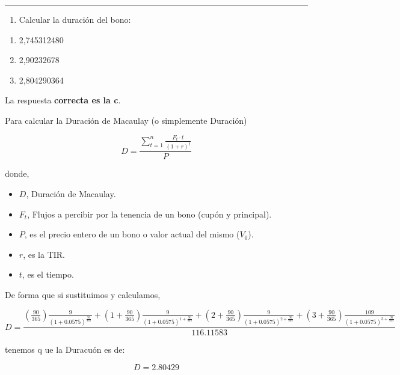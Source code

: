 \documentclass[
  letterpaper,
  DIV=11,
  numbers=noendperiod]{scrartcl}
\providecommand{\tightlist}{%
  \setlength{\itemsep}{0pt}\setlength{\parskip}{0pt}}\usepackage{longtable,booktabs,array}
\begin{document}
\begin{center}\rule{0.5\linewidth}{0.5pt}\end{center}

\begin{enumerate}
\def\labelenumi{\arabic{enumi}.}
\setcounter{enumi}{1}
\tightlist
\item
  Calcular la duración del bono:
\end{enumerate}

\begin{enumerate}
\def\labelenumi{\alph{enumi}.}
\item
  2,745312480
\item
  2,90232678
\item
  2,804290364
\end{enumerate}

\begin{tcolorbox}[enhanced jigsaw, colframe=quarto-callout-tip-color-frame, opacityback=0, opacitybacktitle=0.6, colback=white, leftrule=.75mm, bottomtitle=1mm, colbacktitle=quarto-callout-tip-color!10!white, coltitle=black, toprule=.15mm, left=2mm, breakable, toptitle=1mm, titlerule=0mm, title=\textcolor{quarto-callout-tip-color}{\faLightbulb}\hspace{0.5em}{Solución}, arc=.35mm, rightrule=.15mm, bottomrule=.15mm]

La respuesta \textbf{correcta es la c}.

Para calcular la Duración de Macaulay (o simplemente Duración)

\[D=\frac{\sum_{t=1}^{n}\frac{F_t\cdot t}{\left(1+r\right)^t}}{P}\]

donde,

\begin{itemize}
\item
  \(D\), Duración de Macaulay.
\item
  \(F_t\), Flujos a percibir por la tenencia de un bono (cupón y
  principal).
\item
  \(P\), es el precio entero de un bono o valor actual del mismo
  (\(V_0\)).
\item
  \(r\), es la TIR.
\item
  \(t\), es el tiempo.
\end{itemize}

De forma que si sustituimos y calculamos,

\[D=\frac{\left(\frac{90}{365}\right)\frac{9}{\left(1+0.0575\right)^{\frac{90}{365}}}+\left(1+\frac{90}{365}\right)\frac{9}{\left(1+0.0575\right)^{1+\frac{90}{365}}}+\left(2+\frac{90}{365}\right)\frac{9}{\left(1+0.0575\right)^{2+\frac{90}{365}}}+\left(3+\frac{90}{365}\right)\frac{109}{\left(1+0.0575\right)^{3+\frac{90}{365}}}}{116.11583}\]

tenemos q ue la Duracuón es de:

\[D=2.80429\]

\end{tcolorbox}
\end{document}
